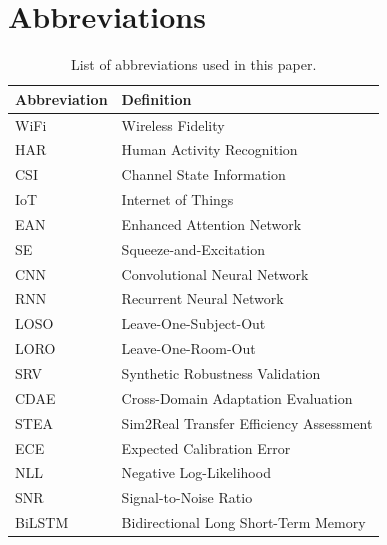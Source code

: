 \documentclass[lettersize,journal]{IEEEtran}
\begin{document}
\section{Abbreviations}
\begin{table}[h]
\centering
\caption{List of abbreviations used in this paper.}
\label{tab:abbreviations}
\small
\begin{tabular}{@{}ll@{}}
\toprule
\textbf{Abbreviation} & \textbf{Definition} \\
\midrule
WiFi & Wireless Fidelity \\
HAR & Human Activity Recognition \\
CSI & Channel State Information \\
IoT & Internet of Things \\
EAN & Enhanced Attention Network \\
SE & Squeeze-and-Excitation \\
CNN & Convolutional Neural Network \\
RNN & Recurrent Neural Network \\
LOSO & Leave-One-Subject-Out \\
LORO & Leave-One-Room-Out \\
SRV & Synthetic Robustness Validation \\
CDAE & Cross-Domain Adaptation Evaluation \\
STEA & Sim2Real Transfer Efficiency Assessment \\
ECE & Expected Calibration Error \\
NLL & Negative Log-Likelihood \\
SNR & Signal-to-Noise Ratio \\
BiLSTM & Bidirectional Long Short-Term Memory \\
\bottomrule
\end{tabular}
\end{table}



\end{document}
